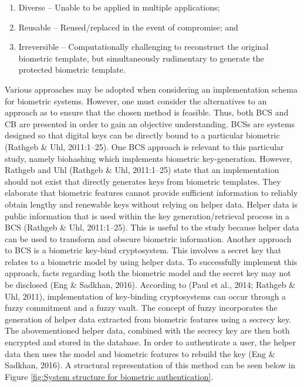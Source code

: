 \begin{enumerate}[label=\roman*.]
	\item Diverse – Unable to be applied in multiple applications;
	\item Reusable – Reused/replaced in the event of compromise; and
	\item Irreversible – Computationally challenging to reconstruct the original biometric template, but simultaneously rudimentary to generate the protected biometric template.
\end{enumerate}

Various approaches may be adopted when considering an implementation schema for biometric systems. However, one must consider the alternatives to an approach as to ensure that the chosen method is feasible. Thus, both BCS and CB are presented in order to gain an objective understanding. 
BCSs are systems designed so that digital keys can be directly bound to a particular biometric (Rathgeb \& Uhl, 2011:1–25). One BCS approach is relevant to this particular study, namely biohashing which implements biometric key-generation. However, Rathgeb and Uhl (Rathgeb \& Uhl, 2011:1–25) state that an implementation should not exist that directly generates keys from biometric templates. They elaborate that biometric features cannot provide sufficient information to reliably obtain lengthy and renewable keys without relying on helper data. Helper data is public information that is used within the key generation/retrieval process in a BCS (Rathgeb \& Uhl, 2011:1–25).  This is useful to the study because helper data can be used to transform and obscure biometric information. Another approach to BCS is a biometric key-bind cryptosystem. This involves a secret key that relates to a biometric model by using helper data. To successfully implement this approach, facts regarding both the biometric model and the secret key may not be disclosed (Eng \& Sadkhan, 2016). According to (Paul et al., 2014; Rathgeb \& Uhl, 2011), implementation of key-binding cryptosystems can occur through a fuzzy commitment and a fuzzy vault. The concept of fuzzy incorporates the generation of helper data extracted from biometric features using a secrecy key. The abovementioned helper data, combined with the secrecy key are then both encrypted and stored in the database. In order to authenticate a user, the helper data then uses the model and biometric features to rebuild the key (Eng \& Sadkhan, 2016). A structural representation of this method can be seen below in Figure \ref{fig:System structure for biometric authentication}.


